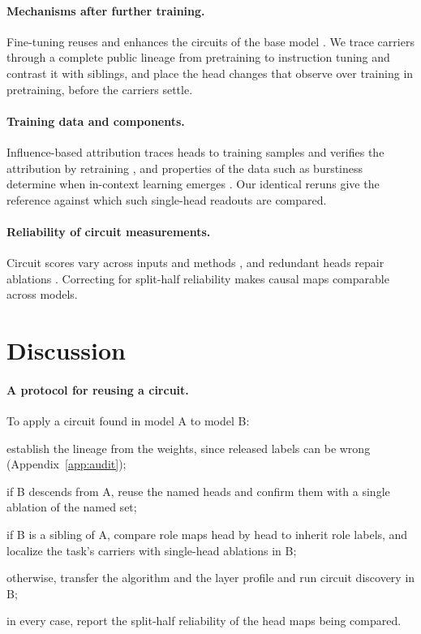 \documentclass[11pt]{article}
\begin{document}
\paragraph{Mechanisms after further training.}
Fine-tuning reuses and enhances the circuits of the base model \citep{prakash2024finetuning}.
We trace carriers through a complete public lineage from pretraining to instruction tuning and contrast it with siblings, and place the head changes that \citet{tigges2024llm} observe over training in pretraining, before the carriers settle.

\paragraph{Training data and components.}
Influence-based attribution traces heads to training samples and verifies the attribution by retraining \citep{chen2026mechanistic}, and properties of the data such as burstiness determine when in-context learning emerges \citep{chan2022data}.
Our identical reruns give the reference against which such single-head readouts are compared.

\paragraph{Reliability of circuit measurements.}
Circuit scores vary across inputs and methods \citep{meloux2026statistical}, and redundant heads repair ablations \citep{mcgrath2023hydra}.
Correcting for split-half reliability makes causal maps comparable across models.

\section{Discussion}
\label{sec:discussion}

\paragraph{A protocol for reusing a circuit.}
To apply a circuit found in model A to model B:
\begin{enumerate*}[label=(\roman*)]
\item establish the lineage from the weights, since released labels can be wrong (Appendix~\ref{app:audit});
\item if B descends from A, reuse the named heads and confirm them with a single ablation of the named set;
\item if B is a sibling of A, compare role maps head by head to inherit role labels, and localize the task's carriers with single-head ablations in B;
\item otherwise, transfer the algorithm and the layer profile and run circuit discovery in B;
\item in every case, report the split-half reliability of the head maps being compared.
\end{enumerate*}
\end{document}
